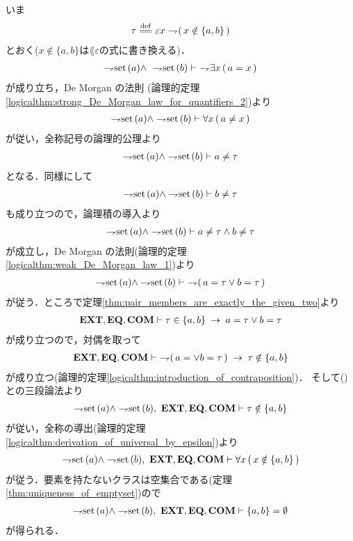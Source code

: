 	\begin{sketch}
		いま
		\begin{align}
			\tau \defeq \varepsilon x \negation (\, x \notin \{a,b\}\, )
		\end{align}
		とおく($x \notin \{a,b\}$は$\lang{\varepsilon}$の式に書き換える)．
		\begin{align}
			\rightharpoondown\hspace{-0.25em} \operatorname*{set}\hspace{0.15em}(a) \wedge\ \rightharpoondown\hspace{-0.25em} \operatorname*{set}\hspace{0.15em}(b)
			\vdash\ \rightharpoondown\hspace{-0.25em} \exists x\, (\, a = x\, )
		\end{align}
		が成り立ち，De Morgan の法則
		(論理的定理\ref{logicalthm:strong_De_Morgan_law_for_quantifiers_2})より
		\begin{align}
			\rightharpoondown\hspace{-0.25em} \operatorname*{set}\hspace{0.15em}(a) \wedge \rightharpoondown\hspace{-0.25em} \operatorname*{set}\hspace{0.15em}(b)
			\vdash \forall x\, (\, a \neq x\, )
		\end{align}
		が従い，全称記号の論理的公理より
		\begin{align}
			\rightharpoondown\hspace{-0.25em} \operatorname*{set}\hspace{0.15em}(a) \wedge \rightharpoondown\hspace{-0.25em} \operatorname*{set}\hspace{0.15em}(b) \vdash a \neq \tau
		\end{align}
		となる．同様にして
		\begin{align}
			\rightharpoondown\hspace{-0.25em} \operatorname*{set}\hspace{0.15em}(a) \wedge \rightharpoondown\hspace{-0.25em} \operatorname*{set}\hspace{0.15em}(b) \vdash b \neq \tau
		\end{align}
		も成り立つので，論理積の導入より
		\begin{align}
			\rightharpoondown\hspace{-0.25em} \operatorname*{set}\hspace{0.15em}(a) \wedge \rightharpoondown\hspace{-0.25em} \operatorname*{set}\hspace{0.15em}(b) \vdash
			a \neq \tau \wedge b \neq \tau
		\end{align}
		が成立し，De Morgan の法則(論理的定理\ref{logicalthm:weak_De_Morgan_law_1})より
		\begin{align}
			\negation \set{a} \wedge \negation \set{b} \vdash\ 
			\negation (\, a = \tau \vee b = \tau\, )
			\label{fom:pair_of_proper_classes_is_emptyset_1}
		\end{align}
		が従う．ところで定理\ref{thm:pair_members_are_exactly_the_given_two}より
		\begin{align}
			\mbox{{\bf EXT}},\mbox{{\bf EQ}},\mbox{\bf COM} \vdash \tau \in \{a,b\} \hspace{0.25em}\rightarrow\hspace{0.25em} a = \tau \vee b = \tau
		\end{align}
		が成り立つので，対偶を取って
		\begin{align}
			\EXTAX,\EQAX,\COMAX \vdash\ 
			\negation (\, a = \vee b = \tau\, ) \rarrow \tau \notin \{a,b\}
		\end{align}
		が成り立つ(論理的定理\ref{logicalthm:introduction_of_contraposition})．
		そして()との三段論法より
		\begin{align}
			\negation \set{a} \wedge \negation \set{b},\ \EXTAX,\EQAX,\COMAX \vdash
			\tau \notin \{a,b\}
		\end{align}
		が従い，全称の導出(論理的定理\ref{logicalthm:derivation_of_universal_by_epsilon})より
		\begin{align}
			\negation \set{a} \wedge \negation \set{b},\ \EXTAX,\EQAX,\COMAX \vdash
			\forall x\, (\, x \notin \{a,b\}\, )
		\end{align}
		が従う．要素を持たないクラスは空集合である(定理\ref{thm:uniqueness_of_emptyset})ので
		\begin{align}
			\negation \set{a} \wedge \negation \set{b},\ \EXTAX,\EQAX,\COMAX \vdash
			\{a,b\} = \emptyset
		\end{align}
		が得られる．
		\QED
	\end{sketch}
	
